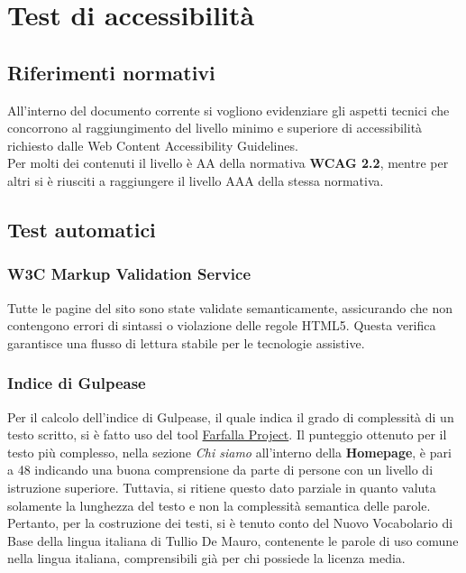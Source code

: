 \documentclass[a4paper,10pt]{article}
\begin{document}
	\tableofcontents
	\clearpage
	
	\section{Test di accessibilità}
	
	\subsection{Riferimenti normativi}
	All'interno del documento corrente si vogliono evidenziare gli aspetti tecnici che concorrono al raggiungimento del livello minimo e superiore di accessibilità richiesto dalle Web Content Accessibility Guidelines.\\
	Per molti dei contenuti il livello è AA della normativa \textbf{WCAG 2.2}, mentre per altri si è riusciti a raggiungere il livello AAA della stessa normativa.
	
	\subsection{Test automatici}
	
	\subsubsection{W3C Markup Validation Service}
	Tutte le pagine del sito sono state validate semanticamente, assicurando che non contengono errori di sintassi o violazione delle regole HTML5. Questa verifica garantisce una flusso di lettura stabile per le tecnologie assistive.
	
	\subsubsection{Indice di Gulpease}
	Per il calcolo dell'indice di Gulpease, il quale indica il grado di complessità di un testo scritto, si è fatto uso del tool \href{https://farfalla-project.org/readability_static}{Farfalla Project}. Il punteggio ottenuto per il testo più complesso, nella sezione \textit{Chi siamo} all'interno della \textbf{Homepage}, è pari a 48 indicando una buona comprensione da parte di persone con un livello di istruzione superiore. Tuttavia, si ritiene questo dato parziale in quanto valuta solamente la lunghezza del testo e non la complessità semantica delle parole. Pertanto, per la costruzione dei testi, si è tenuto conto del Nuovo Vocabolario di Base della lingua italiana di Tullio De Mauro, contenente le parole di uso comune nella lingua italiana, comprensibili già per chi possiede la licenza media.
	
\end{document}
